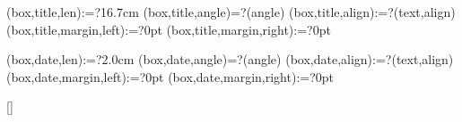 \spine(box,title,len):=?{16.7cm}
\spine(box,title,angle)=?{\thespine(angle)}
\spine(box,title,align):=?{\thespine(text,align)}
\spine(box,title,margin,left):=?{0pt}
\spine(box,title,margin,right):=?{0pt}

\spine(box,date,len):=?{2.0cm}
\spine(box,date,angle)=?{\thespine(angle)}
\spine(box,date,align):=?{\thespine(text,align)}
\spine(box,date,margin,left):=?{0pt}
\spine(box,date,margin,right):=?{0pt}



\newif\ifisdim
\newcommand{\@setifisdim}[1]{%
  \StrLeft{#1}{1}[\@dimleft]%
  \StrRight{#1}{1}[\@dimright]%
  \IfInteger{\@dimleft}{%
    \IfInteger{\@dimright}{%
      \isdimfalse%
    }{%
      \isdimtrue%
    }%
  }{%
    \isdimfalse%
  }%
}
\newcommand{\IfIsDim}[3]{%
  \@setifisdim{#1}%
  \ifisdim#2\else#3\fi%
}


\newlength{\@spinelen}  %
\newlength{\@spineboxlen} %
\newlength{\@spinefixedlen} %
\newlength{\@spinevarlen} %
\newlength{\@spineboxseplen} %
\newlength{\@spinelr} %
\newlength{\@spinevarratio} %
[\@spineNBoxes]%


\newcommand{\@getspinelen}{%
  \setlength{\@spinelr}{\dimexpr\thespine(margin,left)+\thespine(margin,right)\relax}%
  \setlength{\@spineboxseplen}{\dimexpr \thespine(boxsep)*3\relax}%
  \setlength{\@spinefixedlen}{\dimexpr \@spinelr+\@spineboxseplen\relax}
  \setlength{\@spineboxlen}{0pt}
  \setlength{\@spinevarlen}{0pt}
  \@for\myi:=\expanded{\thespine(order)}\do{%
    \@tempdima=\dimexpr \thespine(box,\myi,len)\relax%
    \spine(box,\myi,len):={\the\@tempdima}
    \addtolength{\@spineboxlen}{\@tempdima}
    \ifdatadefined{spine}(box,\myi,len){%
      \addtolength{\@spinefixedlen}{\@tempdima}
    }{%
      \addtolength{\@spinevarlen}{\@tempdima}
    }%
  }%
  \setlength{\@spinelen}{\dimexpr \@spinefixedlen+\@spinevarlen\relax}
}

